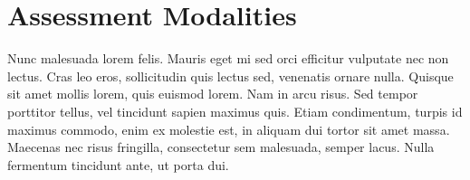 \section{Assessment Modalities}
Nunc malesuada lorem felis. Mauris eget mi sed orci efficitur vulputate nec non lectus. Cras leo eros, sollicitudin quis lectus sed, venenatis ornare nulla. Quisque sit amet mollis lorem, quis euismod lorem. Nam in arcu risus. Sed tempor porttitor tellus, vel tincidunt sapien maximus quis. Etiam condimentum, turpis id maximus commodo, enim ex molestie est, in aliquam dui tortor sit amet massa. Maecenas nec risus fringilla, consectetur sem malesuada, semper lacus. Nulla fermentum tincidunt ante, ut porta dui. 